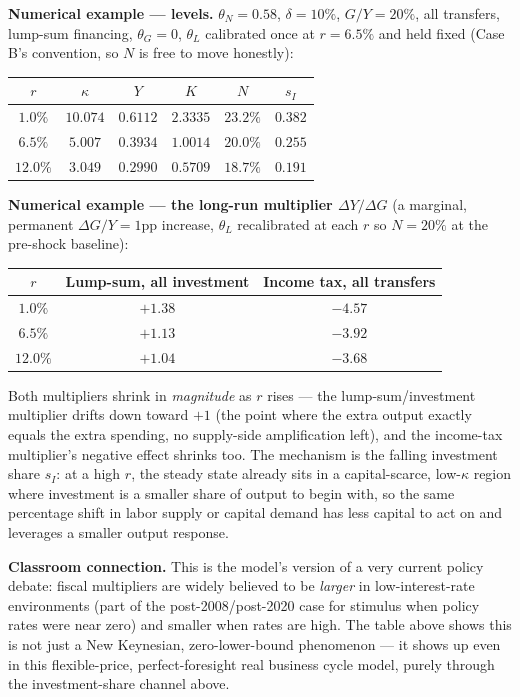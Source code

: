 \documentclass[11pt]{article}
\begin{document}
\begin{casebox}
\textbf{Numerical example --- levels.} $\theta_N=0.58$, $\delta=10\%$,
$G/Y=20\%$, all transfers, lump-sum financing, $\theta_G=0$, $\theta_L$
calibrated once at $r=6.5\%$ and held fixed (Case B's convention, so $N$
is free to move honestly):
\begin{center}
\begin{tabular}{cccccc}
\toprule
$r$ & $\kappa$ & $Y$ & $K$ & $N$ & $s_I$ \\
\midrule
$1.0\%$  & $10.074$ & $0.6112$ & $2.3335$ & $23.2\%$ & $0.382$ \\
$6.5\%$  & $5.007$  & $0.3934$ & $1.0014$ & $20.0\%$ & $0.255$ \\
$12.0\%$ & $3.049$  & $0.2990$ & $0.5709$ & $18.7\%$ & $0.191$ \\
\bottomrule
\end{tabular}
\end{center}

\textbf{Numerical example --- the long-run multiplier $\Delta Y/\Delta G$}
(a marginal, permanent $\Delta G/Y=1$pp increase, $\theta_L$ recalibrated
at each $r$ so $N=20\%$ at the pre-shock baseline):
\begin{center}
\begin{tabular}{ccc}
\toprule
$r$ & Lump-sum, all investment & Income tax, all transfers \\
\midrule
$1.0\%$  & $+1.38$ & $-4.57$ \\
$6.5\%$  & $+1.13$ & $-3.92$ \\
$12.0\%$ & $+1.04$ & $-3.68$ \\
\bottomrule
\end{tabular}
\end{center}
\end{casebox}

Both multipliers shrink in \emph{magnitude} as $r$ rises --- the
lump-sum/investment multiplier drifts down toward $+1$ (the point where
the extra output exactly equals the extra spending, no supply-side
amplification left), and the income-tax multiplier's negative effect
shrinks too. The mechanism is the falling investment share $s_I$: at a
high $r$, the steady state already sits in a capital-scarce, low-$\kappa$
region where investment is a smaller share of output to begin with, so
the same percentage shift in labor supply or capital demand has less
capital to act on and leverages a smaller output response.

\begin{notebox}
\textbf{Classroom connection.} This is the model's version of a very
current policy debate: fiscal multipliers are widely believed to be
\emph{larger} in low-interest-rate environments (part of the
post-2008/post-2020 case for stimulus when policy rates were near zero)
and smaller when rates are high. The table above shows this is not
just a New Keynesian, zero-lower-bound phenomenon --- it shows up even in
this flexible-price, perfect-foresight real business cycle model, purely
through the investment-share channel above.
\end{notebox}
\end{document}
